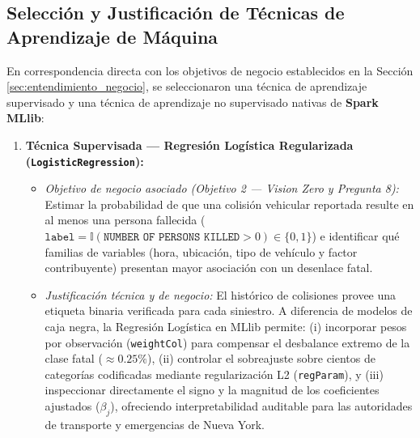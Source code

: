 \documentclass[11pt,a4paper]{article}
\begin{document}
\subsection{Selección y Justificación de Técnicas de Aprendizaje de Máquina}
\label{subsec:seleccion_tecnicas_num3}

En correspondencia directa con los objetivos de negocio establecidos en la Sección \ref{sec:entendimiento_negocio}, se seleccionaron una técnica de aprendizaje supervisado y una técnica de aprendizaje no supervisado nativas de \textbf{Spark MLlib}:

\begin{enumerate}
    \item \textbf{Técnica Supervisada --- Regresión Logística Regularizada (\texttt{LogisticRegression}):}
    \begin{itemize}
        \item \textit{Objetivo de negocio asociado (Objetivo 2 --- Vision Zero y Pregunta 8):} Estimar la probabilidad de que una colisión vehicular reportada resulte en al menos una persona fallecida ($\texttt{label} = \mathbb{I}(\texttt{NUMBER OF PERSONS KILLED} > 0) \in \{0, 1\}$) e identificar qué familias de variables (hora, ubicación, tipo de vehículo y factor contribuyente) presentan mayor asociación con un desenlace fatal.
        \item \textit{Justificación técnica y de negocio:} El histórico de colisiones provee una etiqueta binaria verificada para cada siniestro. A diferencia de modelos de caja negra, la Regresión Logística en MLlib permite: (i) incorporar pesos por observación (\texttt{weightCol}) para compensar el desbalance extremo de la clase fatal ($\approx 0.25\%$), (ii) controlar el sobreajuste sobre cientos de categorías codificadas mediante regularización L2 (\texttt{regParam}), y (iii) inspeccionar directamente el signo y la magnitud de los coeficientes ajustados ($\beta_j$), ofreciendo interpretabilidad auditable para las autoridades de transporte y emergencias de Nueva York.
    \end{itemize}


\end{enumerate}
\end{document}
